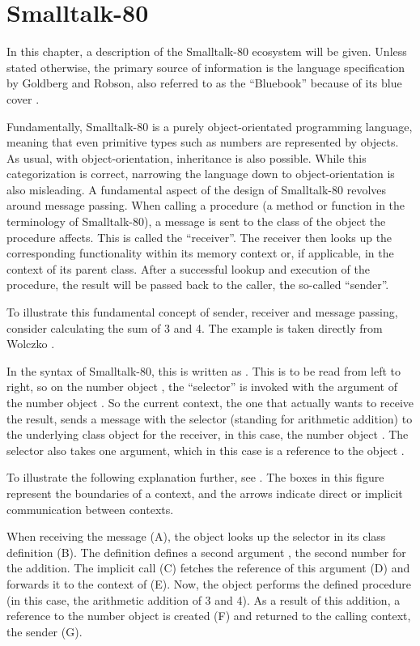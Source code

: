\chapter{Smalltalk-80}\label{cha:smalltalk}
In this chapter, a description of the Smalltalk-80 ecosystem will be given. 
Unless stated otherwise, the primary source of information is the language specification by Goldberg and Robson, also referred to as the \enquote{Bluebook} because of its blue cover \cite{bluebook1983}.

Fundamentally, Smalltalk-80 is a purely object-orientated programming language, meaning that even primitive types such as numbers are represented by objects. 
As usual, with object-orientation, inheritance is also possible.
While this categorization is correct, narrowing the language down to object-orientation is also misleading. 
A fundamental aspect of the design of Smalltalk-80 revolves around message passing. 
When calling a procedure (a method or function in the terminology of Smalltalk-80), a message is sent to the class of the object the procedure affects. This is called the \enquote{receiver}.
The receiver then looks up the corresponding functionality within its memory context or, if applicable, in the context of its parent class.
After a successful lookup and execution of the procedure, the result will be passed back to the caller, the so-called \enquote{sender}. 

To illustrate this fundamental concept of sender, receiver and message passing, consider calculating the sum of 3 and 4. 
The example is taken directly from Wolczko \cite{Wolczko1984}.

In the syntax of Smalltalk-80, this is written as .
This is to be read from left to right, so on the number object , the \enquote{selector} \stcode{+} is invoked with the argument of the number object .
So the current context, the one that actually wants to receive the result, sends a message with the selector \stcode{+} (standing for arithmetic addition) to the underlying class object for the receiver, in this case, the number object . 
The selector \stcode{+} also takes one argument, which in this case is a reference to the object . 

To illustrate the following explanation further, see . The boxes in this figure represent the boundaries of a context, and the arrows indicate direct or implicit communication between contexts.

When receiving the message (A), the object  looks up the selector in its class definition (B). 
The definition defines a second argument , the second number for the addition. The implicit call (C) fetches the reference of this argument (D) and forwards it to the context of  (E).
Now, the object  performs the defined procedure (in this case, the arithmetic addition of 3 and 4). 
As a result of this addition, a reference to the number object  is created (F) and returned to the calling context, the sender (G). 

